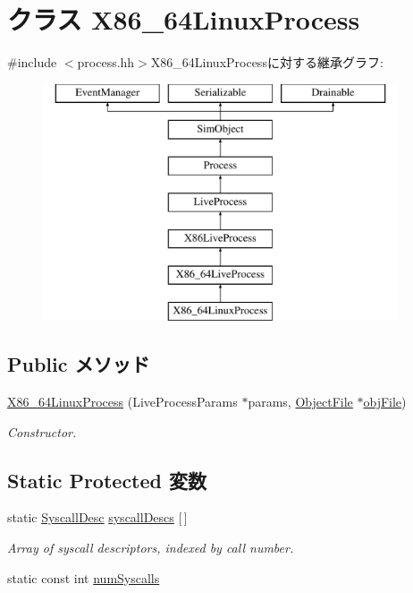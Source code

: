 \hypertarget{classX86ISA_1_1X86__64LinuxProcess}{
\section{クラス X86\_\-64LinuxProcess}
\label{classX86ISA_1_1X86__64LinuxProcess}
}


{\ttfamily \#include $<$process.hh$>$}X86\_\-64LinuxProcessに対する継承グラフ:\begin{figure}[H]
\begin{center}
\leavevmode
\includegraphics[height=7cm]{classX86ISA_1_1X86__64LinuxProcess}
\end{center}
\end{figure}
\subsection*{Public メソッド}
\begin{DoxyCompactItemize}
\item 
\hyperlink{classX86ISA_1_1X86__64LinuxProcess_adaa4c0fcc6370169609616d5ff41a6a0}{X86\_\-64LinuxProcess} (LiveProcessParams $\ast$params, \hyperlink{classObjectFile}{ObjectFile} $\ast$\hyperlink{classLiveProcess_ab6cfcfa7903c66267b3e0351c3caa809}{objFile})
\begin{DoxyCompactList}\small\item\em Constructor. \item\end{DoxyCompactList}\end{DoxyCompactItemize}
\subsection*{Static Protected 変数}
\begin{DoxyCompactItemize}
\item 
static \hyperlink{classSyscallDesc}{SyscallDesc} \hyperlink{classX86ISA_1_1X86__64LinuxProcess_a08d67a94820b75842e07f030e548372e}{syscallDescs} \mbox{[}$\,$\mbox{]}
\begin{DoxyCompactList}\small\item\em Array of syscall descriptors, indexed by call number. \item\end{DoxyCompactList}\item 
static const int \hyperlink{classX86ISA_1_1X86__64LinuxProcess_af2d1f57bee0c3a25f48faee7ab23c768}{numSyscalls}
\end{DoxyCompactItemize}


